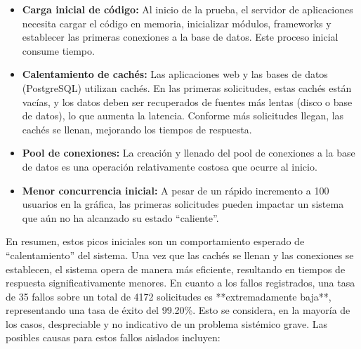 \begin{itemize}
    \item \textbf{Carga inicial de código:} Al inicio de la prueba, el servidor de aplicaciones necesita cargar el código en memoria, inicializar módulos, frameworks y establecer las primeras conexiones a la base de datos. Este proceso inicial consume tiempo.
    \item \textbf{Calentamiento de cachés:} Las aplicaciones web y las bases de datos (PostgreSQL) utilizan cachés. En las primeras solicitudes, estas cachés están vacías, y los datos deben ser recuperados de fuentes más lentas (disco o base de datos), lo que aumenta la latencia. Conforme más solicitudes llegan, las cachés se llenan, mejorando los tiempos de respuesta.
    \item \textbf{Pool de conexiones:} La creación y llenado del pool de conexiones a la base de datos es una operación relativamente costosa que ocurre al inicio.
    \item \textbf{Menor concurrencia inicial:} A pesar de un rápido incremento a 100 usuarios en la gráfica, las primeras solicitudes pueden impactar un sistema que aún no ha alcanzado su estado ``caliente''.
\end{itemize}
En resumen, estos picos iniciales son un comportamiento esperado de ``calentamiento'' del sistema. Una vez que las cachés se llenan y las conexiones se establecen, el sistema opera de manera más eficiente, resultando en tiempos de respuesta significativamente menores.
\newline\newline
En cuanto a los fallos registrados, una tasa de 35 fallos sobre un total de 4172 solicitudes es **extremadamente baja**, representando una tasa de éxito del 99.20\%. Esto se considera, en la mayoría de los casos, despreciable y no indicativo de un problema sistémico grave. Las posibles causas para estos fallos aislados incluyen:

